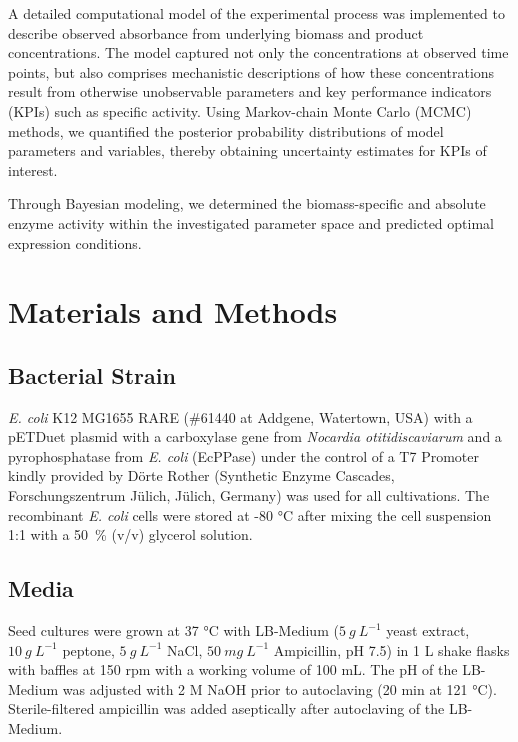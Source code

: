 \documentclass[sn-standardnature]{sn-jnl}%
\theoremstyle{thmstyleone}%
\theoremstyle{thmstyletwo}%
\theoremstyle{thmstylethree}%
\begin{document}
A detailed computational model of the experimental process was implemented to describe observed absorbance from underlying biomass and product concentrations.
The model captured not only the concentrations at observed time points, but also comprises mechanistic descriptions of how these concentrations result from otherwise unobservable parameters and key performance indicators (KPIs) such as specific activity.
Using Markov-chain Monte Carlo (MCMC) methods, we quantified the posterior probability distributions of model parameters and variables, thereby obtaining uncertainty estimates for KPIs of interest.

Through Bayesian modeling, we determined the biomass-specific and absolute enzyme activity within the investigated parameter space and predicted optimal expression conditions.

\section*{Materials and Methods}
\label{sec_mmm}

\subsection{Bacterial Strain}

\textit{E. coli} K12 MG1655 RARE (\#61440 at Addgene, Watertown, USA) with a pETDuet plasmid with a carboxylase gene from \textit{Nocardia otitidiscaviarum} and a pyrophosphatase from \textit{E. coli} (EcPPase) under the control of a T7 Promoter \cite{weber2021production} kindly provided by Dörte Rother (Synthetic Enzyme Cascades, Forschungszentrum Jülich, Jülich, Germany) was used for all cultivations.
The recombinant \textit{E. coli} cells were stored at -80 °C after mixing the cell suspension 1:1 with a 50~\% (v/v) glycerol solution.

\subsection{Media}

Seed cultures were grown at 37 °C with LB-Medium ($5\ g\ L^{-1}$ yeast extract, $10\ g\ L^{-1}$ peptone, $5\ g\ L^{-1}$ NaCl, $50\ mg\ L^{-1}$ Ampicillin, pH 7.5) in 1 L shake flasks with baffles at 150 rpm with a working volume of 100 mL.
The pH of the LB-Medium was adjusted with 2 M NaOH prior to autoclaving (20 min at 121 °C).
Sterile-filtered ampicillin  was added aseptically after autoclaving of the LB-Medium.
\end{document}
